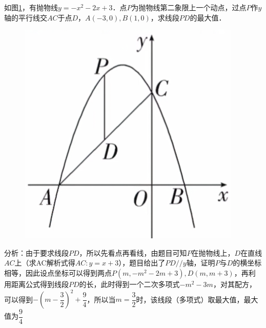 \begin{example}
如图\ref{fig:g3}，有抛物线\(y=-x^2-2x+3\)．点$P$为抛物线第二象限上一个动点，过点$P$作$y$轴的平行线交$AC$于点$D$，\(A(-3,0), B(1, 0)\)，求线段$PD$的最大值．

\begin{figure}
\vspace{-1cm}
    \includegraphics[width=1\linewidth]{figure/g3.png}
    \caption{}
    \label{fig:g3}
\end{figure}

\begin{solution}
    分析：由于要求线段\(PD\)，所以先看点再看线，由题目可知\(P\)在抛物线上，\(D\)在直线\(AC\)上（求AC解析式得\(AC:y=x+3\)），题目给出了\(PD//y\)轴，证明\(P\)与\(D\)的横坐标相等，因此设点坐标可以得到两点\(P(m, -m^2-2m+3), D(m, m+3)\)，再利用距离公式得到线段\(PD\)的长，此时得到一个二次多项式\(-m^2-3m\)，对其配方，可以得到\(-(m-\dfrac{3}{2})^2+\dfrac{9}{4}\)，所以当\(m=\dfrac{3}{2}\)时，该线段（多项式）取最大值，最大值为\(\dfrac{9}{4}\)
\end{solution}

\end{example}


